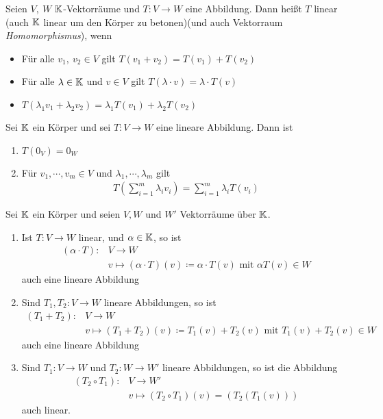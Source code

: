 \begin{definition}
Seien $V,\ W$ $\mathbb{K}$-Vektorräume und $T:V\to W$ eine Abbildung.
Dann heißt $T$ linear (auch $\mathbb{K}$ linear um den Körper zu betonen)(und auch Vektorraum \textit{Homomorphismus}), wenn
\begin{itemize}
    \item Für alle $v_1,\ v_2\in V$ gilt $T(v_1+v_2)=T(v_1)+T(v_2)$
    \item Für alle $\lambda\in\mathbb{K}$ und $v \in V$ gilt $T(\lambda\cdot v)=\lambda\cdot T(v)$
    \item $T(\lambda_1 v_1+\lambda_2 v_2)=\lambda_1T(v_1)+\lambda_2T(v_2)$
\end{itemize}
\end{definition}

\begin{proposition}
Sei $\mathbb{K}$ ein Körper und sei $T:V \to W$ eine lineare Abbildung.
Dann ist 
\begin{enumerate}
    \item $T(0_V)=0_W$
    \item Für $v_1,\dotsb,v_m \in V$ und $\lambda_1,\dotsb,\lambda_m$ gilt
    \begin{align*}
        T\left(\sum_{i=1}^m\lambda_iv_i\right)=\sum_{i=1}^m\lambda_iT(v_i)
    \end{align*}
\end{enumerate}
\end{proposition}

\begin{lemma}
Sei $\mathbb{K}$ ein Körper und seien $V,W$ und $W'$ Vektorräume über $\mathbb{K}$.
\begin{enumerate}[1.]
    \item Ist $T:V\to W$ linear, und $\alpha\in\mathbb{K}$, so ist 
    \begin{align*}
        (\alpha\cdot T):&V\to W\\
        &v \mapsto (\alpha\cdot T)(v)\coloneqq \alpha\cdot T(v) \text{   mit } \alpha T(v)\in W
    \end{align*}
    auch eine lineare Abbildung
    \item Sind $T_1,T_2:V\to W$ lineare Abbildungen, so ist 
    \begin{align*}
        (T_1+T_2):&V\to W\\
        &v \mapsto (T_1+T_2)(v)\coloneqq T_1(v)+T_2(v) \text{   mit } T_1(v)+T_2(v)\in W
    \end{align*}
    auch eine lineare Abbildung
    \item Sind $T_1:V\to W$ und $T_2:W\to W'$ lineare Abbildungen, so ist die Abbildung
    \begin{align*}
        (T_2\circ T_1):&V\to W'\\
        &v\mapsto (T_2\circ T_1)(v)=(T_2(T_1(v)))
    \end{align*}
    auch linear.
\end{enumerate}
\end{lemma}

